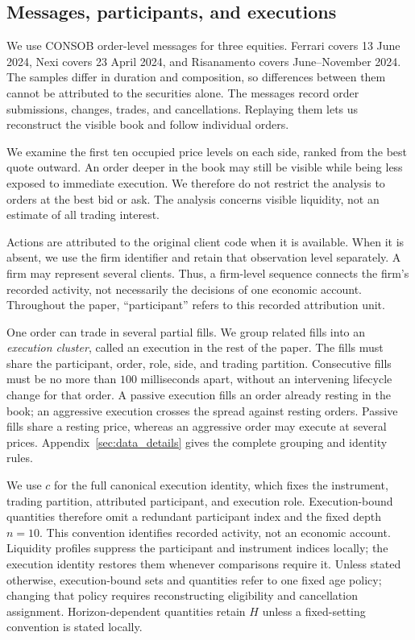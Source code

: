 \documentclass[11pt]{article}
\begin{document}
\subsection{Messages, participants, and executions}
We use CONSOB order-level messages for three equities. Ferrari covers 13 June 2024, Nexi covers 23 April 2024, and Risanamento covers June--November 2024. The samples differ in duration and composition, so differences between them cannot be attributed to the securities alone. The messages record order submissions, changes, trades, and cancellations. Replaying them lets us reconstruct the visible book and follow individual orders.

We examine the first ten occupied price levels on each side, ranked from the best quote outward. An order deeper in the book may still be visible while being less exposed to immediate execution. We therefore do not restrict the analysis to orders at the best bid or ask. The analysis concerns visible liquidity, not an estimate of all trading interest.

Actions are attributed to the original client code when it is available. When it is absent, we use the firm identifier and retain that observation level separately. A firm may represent several clients. Thus, a firm-level sequence connects the firm's recorded activity, not necessarily the decisions of one economic account. Throughout the paper, ``participant'' refers to this recorded attribution unit.

One order can trade in several partial fills. We group related fills into an \emph{execution cluster}, called an execution in the rest of the paper. The fills must share the participant, order, role, side, and trading partition. Consecutive fills must be no more than $100$ milliseconds apart, without an intervening lifecycle change for that order. A passive execution fills an order already resting in the book; an aggressive execution crosses the spread against resting orders. Passive fills share a resting price, whereas an aggressive order may execute at several prices. Appendix~\ref{sec:data_details} gives the complete grouping and identity rules.

We use $c$ for the full canonical execution identity, which fixes the instrument, trading partition, attributed participant, and execution role. Execution-bound quantities therefore omit a redundant participant index and the fixed depth $n=10$. This convention identifies recorded activity, not an economic account. Liquidity profiles suppress the participant and instrument indices locally; the execution identity restores them whenever comparisons require it. Unless stated otherwise, execution-bound sets and quantities refer to one fixed age policy; changing that policy requires reconstructing eligibility and cancellation assignment. Horizon-dependent quantities retain $H$ unless a fixed-setting convention is stated locally.
\end{document}
